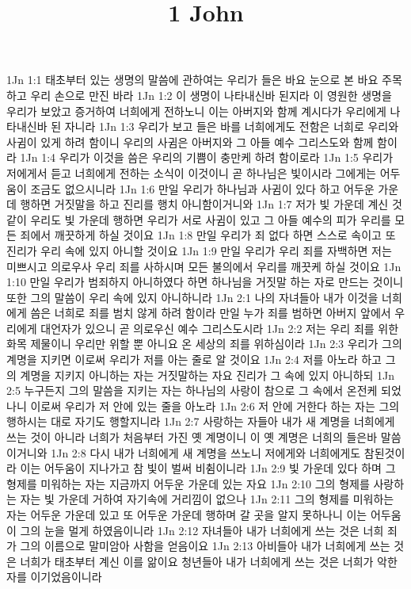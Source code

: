 

\title{1 John}

1Jn 1:1  태초부터 있는 생명의 말씀에 관하여는 우리가 들은 바요 눈으로 본 바요 주목하고 우리 손으로 만진 바라
1Jn 1:2  이 생명이 나타내신바 된지라 이 영원한 생명을 우리가 보았고 증거하여 너희에게 전하노니 이는 아버지와 함께 계시다가 우리에게 나타내신바 된 자니라
1Jn 1:3  우리가 보고 들은 바를 너희에게도 전함은 너희로 우리와 사귐이 있게 하려 함이니 우리의 사귐은 아버지와 그 아들 예수 그리스도와 함께 함이라
1Jn 1:4  우리가 이것을 씀은 우리의 기쁨이 충만케 하려 함이로라
1Jn 1:5  우리가 저에게서 듣고 너희에게 전하는 소식이 이것이니 곧 하나님은 빛이시라 그에게는 어두움이 조금도 없으시니라
1Jn 1:6  만일 우리가 하나님과 사귐이 있다 하고 어두운 가운데 행하면 거짓말을 하고 진리를 행치 아니함이거니와
1Jn 1:7  저가 빛 가운데 계신 것같이 우리도 빛 가운데 행하면 우리가 서로 사귐이 있고 그 아들 예수의 피가 우리를 모든 죄에서 깨끗하게 하실 것이요
1Jn 1:8  만일 우리가 죄 없다 하면 스스로 속이고 또 진리가 우리 속에 있지 아니할 것이요
1Jn 1:9  만일 우리가 우리 죄를 자백하면 저는 미쁘시고 의로우사 우리 죄를 사하시며 모든 불의에서 우리를 깨끗케 하실 것이요
1Jn 1:10  만일 우리가 범죄하지 아니하였다 하면 하나님을 거짓말 하는 자로 만드는 것이니 또한 그의 말씀이 우리 속에 있지 아니하니라
1Jn 2:1  나의 자녀들아 내가 이것을 너희에게 씀은 너희로 죄를 범치 않게 하려 함이라 만일 누가 죄를 범하면 아버지 앞에서 우리에게 대언자가 있으니 곧 의로우신 예수 그리스도시라
1Jn 2:2  저는 우리 죄를 위한 화목 제물이니 우리만 위할 뿐 아니요 온 세상의 죄를 위하심이라
1Jn 2:3  우리가 그의 계명을 지키면 이로써 우리가 저를 아는 줄로 알 것이요
1Jn 2:4  저를 아노라 하고 그의 계명을 지키지 아니하는 자는 거짓말하는 자요 진리가 그 속에 있지 아니하되
1Jn 2:5  누구든지 그의 말씀을 지키는 자는 하나님의 사랑이 참으로 그 속에서 온전케 되었나니 이로써 우리가 저 안에 있는 줄을 아노라
1Jn 2:6  저 안에 거한다 하는 자는 그의 행하시는 대로 자기도 행할지니라
1Jn 2:7  사랑하는 자들아 내가 새 계명을 너희에게 쓰는 것이 아니라 너희가 처음부터 가진 옛 계명이니 이 옛 계명은 너희의 들은바 말씀이거니와
1Jn 2:8  다시 내가 너희에게 새 계명을 쓰노니 저에게와 너희에게도 참된것이라 이는 어두움이 지나가고 참 빛이 벌써 비췸이니라
1Jn 2:9  빛 가운데 있다 하며 그 형제를 미워하는 자는 지금까지 어두운 가운데 있는 자요
1Jn 2:10  그의 형제를 사랑하는 자는 빛 가운데 거하여 자기속에 거리낌이 없으나
1Jn 2:11  그의 형제를 미워하는 자는 어두운 가운데 있고 또 어두운 가운데 행하며 갈 곳을 알지 못하나니 이는 어두움이 그의 눈을 멀게 하였음이니라
1Jn 2:12  자녀들아 내가 너희에게 쓰는 것은 너희 죄가 그의 이름으로 말미암아 사함을 얻음이요
1Jn 2:13  아비들아 내가 너희에게 쓰는 것은 너희가 태초부터 계신 이를 앎이요 청년들아 내가 너희에게 쓰는 것은 너희가 악한 자를 이기었음이니라
